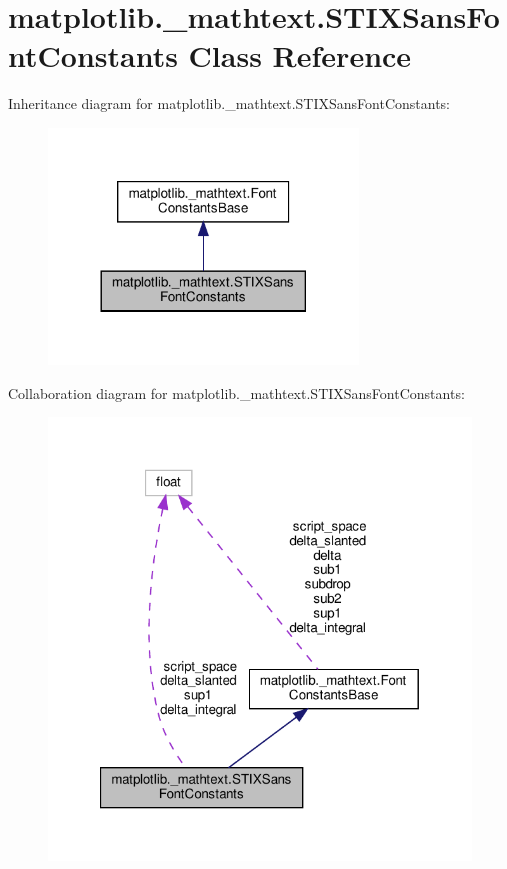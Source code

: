 \hypertarget{classmatplotlib_1_1__mathtext_1_1STIXSansFontConstants}{}\section{matplotlib.\+\_\+mathtext.\+S\+T\+I\+X\+Sans\+Font\+Constants Class Reference}
\label{classmatplotlib_1_1__mathtext_1_1STIXSansFontConstants}


Inheritance diagram for matplotlib.\+\_\+mathtext.\+S\+T\+I\+X\+Sans\+Font\+Constants\+:
\nopagebreak
\begin{figure}[H]
\begin{center}
\leavevmode
\includegraphics[width=233pt]{classmatplotlib_1_1__mathtext_1_1STIXSansFontConstants__inherit__graph}
\end{center}
\end{figure}


Collaboration diagram for matplotlib.\+\_\+mathtext.\+S\+T\+I\+X\+Sans\+Font\+Constants\+:
\nopagebreak
\begin{figure}[H]
\begin{center}
\leavevmode
\includegraphics[width=321pt]{classmatplotlib_1_1__mathtext_1_1STIXSansFontConstants__coll__graph}
\end{center}
\end{figure}

